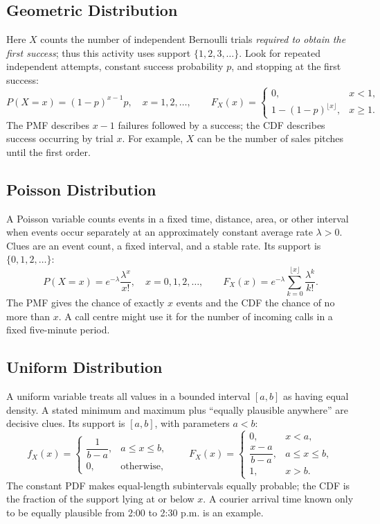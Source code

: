 
	\subsection{Geometric Distribution}
	\label{sec:introduction-geometric}
	Here $X$ counts the number of independent Bernoulli trials \emph{required to obtain the first success}; thus this activity uses support $\{1,2,3,\ldots\}$. Look for repeated independent attempts, constant success probability $p$, and stopping at the first success:
	\[
		P(X=x)=(1-p)^{x-1}p,\quad x=1,2,\ldots,
		\qquad F_X(x)=\begin{cases}0,&x<1,\\1-(1-p)^{\lfloor x\rfloor},&x\ge1.\end{cases}
	\]
	The PMF describes $x-1$ failures followed by a success; the CDF describes success occurring by trial $x$. For example, $X$ can be the number of sales pitches until the first order.


	\subsection{Poisson Distribution}
	\label{sec:introduction-poisson}
	A Poisson variable counts events in a fixed time, distance, area, or other interval when events occur separately at an approximately constant average rate $\lambda>0$. Clues are an event count, a fixed interval, and a stable rate. Its support is $\{0,1,2,\ldots\}$:
	\[
		P(X=x)=e^{-\lambda}\frac{\lambda^x}{x!},\quad x=0,1,2,\ldots,
		\qquad F_X(x)=e^{-\lambda}\sum_{k=0}^{\lfloor x\rfloor}\frac{\lambda^k}{k!}.
	\]
	The PMF gives the chance of exactly $x$ events and the CDF the chance of no more than $x$. A call centre might use it for the number of incoming calls in a fixed five-minute period.


	\subsection{Uniform Distribution}
	\label{sec:introduction-uniform}
	A uniform variable treats all values in a bounded interval $[a,b]$ as having equal density. A stated minimum and maximum plus ``equally plausible anywhere'' are decisive clues. Its support is $[a,b]$, with parameters $a<b$:
	\[
		f_X(x)=\begin{cases}\dfrac1{b-a},&a\le x\le b,\\0,&\text{otherwise},\end{cases}
		\qquad
		F_X(x)=\begin{cases}0,&x<a,\\\dfrac{x-a}{b-a},&a\le x\le b,\\1,&x>b.\end{cases}
	\]
	The constant PDF makes equal-length subintervals equally probable; the CDF is the fraction of the support lying at or below $x$. A courier arrival time known only to be equally plausible from 2:00 to 2:30 p.m. is an example.

